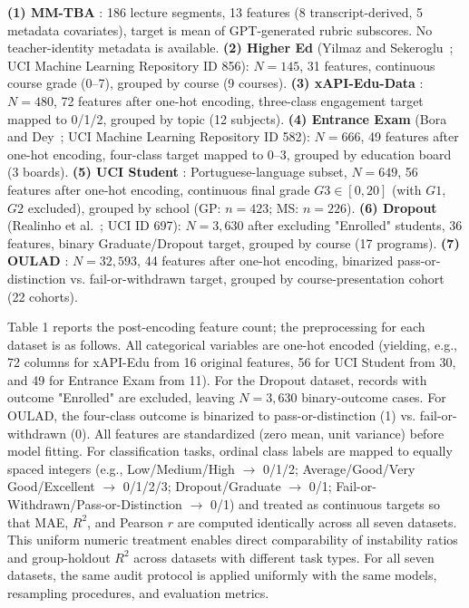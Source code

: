 \textbf{(1) MM-TBA} \citep{Huang2025}: 186 lecture segments, 13 features (8 transcript-derived, 5 metadata covariates), target is mean of GPT-generated rubric subscores. No teacher-identity metadata is available. \textbf{(2) Higher Ed} (Yilmaz and Sekeroglu~\citep{Yilmaz2020}; UCI Machine Learning Repository ID 856): $N=145$, 31 features, continuous course grade (0--7), grouped by course (9 courses). \textbf{(3) xAPI-Edu-Data} \citep{Amrieh2016}: $N=480$, 72 features after one-hot encoding, three-class engagement target mapped to 0/1/2, grouped by topic (12 subjects). \textbf{(4) Entrance Exam} (Bora and Dey~\citep{Bora2021}; UCI Machine Learning Repository ID 582): $N=666$, 49 features after one-hot encoding, four-class target mapped to 0--3, grouped by education board (3 boards). \textbf{(5) UCI Student} \citep{Cortez2008}: Portuguese-language subset, $N=649$, 56 features after one-hot encoding, continuous final grade $G3 \in [0, 20]$ (with $G1$, $G2$ excluded), grouped by school (GP: $n=423$; MS: $n=226$). \textbf{(6) Dropout} (Realinho et al.~\citep{Realinho2022}; UCI ID 697): $N=3{,}630$ after excluding "Enrolled" students, 36 features, binary Graduate/Dropout target, grouped by course (17 programs). \textbf{(7) OULAD} \citep{Kuzilek2017}: $N=32{,}593$, 44 features after one-hot encoding, binarized pass-or-distinction vs. fail-or-withdrawn target, grouped by course-presentation cohort (22 cohorts).

Table 1 reports the post-encoding feature count; the preprocessing for each dataset is as follows. All categorical variables are one-hot encoded (yielding, e.g., 72 columns for xAPI-Edu from 16 original features, 56 for UCI Student from 30, and 49 for Entrance Exam from 11). For the Dropout dataset, records with outcome "Enrolled" are excluded, leaving $N = 3{,}630$ binary-outcome cases. For OULAD, the four-class outcome is binarized to pass-or-distinction (1) vs. fail-or-withdrawn (0). All features are standardized (zero mean, unit variance) before model fitting. For classification tasks, ordinal class labels are mapped to equally spaced integers (e.g., Low/Medium/High $\to$ 0/1/2; Average/Good/Very Good/Excellent $\to$ 0/1/2/3; Dropout/Graduate $\to$ 0/1; Fail-or-Withdrawn/Pass-or-Distinction $\to$ 0/1) and treated as continuous targets so that MAE, $R^2$, and Pearson $r$ are computed identically across all seven datasets. This uniform numeric treatment enables direct comparability of instability ratios and group-holdout $R^2$ across datasets with different task types. For all seven datasets, the same audit protocol is applied uniformly with the same models, resampling procedures, and evaluation metrics.

